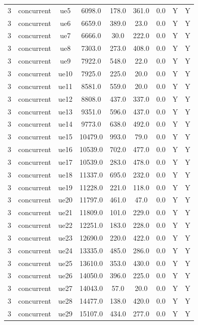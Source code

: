 \begin{table}[ht]
\begin{tabular}{|c|c|c|c|c|c|c|c|c|}
3 & concurrent & ue5 & 6098.0 & 178.0 & 361.0 & 0.0 & Y & Y \\
3 & concurrent & ue6 & 6659.0 & 389.0 & 23.0 & 0.0 & Y & Y \\
3 & concurrent & ue7 & 6666.0 & 30.0 & 222.0 & 0.0 & Y & Y \\
3 & concurrent & ue8 & 7303.0 & 273.0 & 408.0 & 0.0 & Y & Y \\
3 & concurrent & ue9 & 7922.0 & 548.0 & 22.0 & 0.0 & Y & Y \\
3 & concurrent & ue10 & 7925.0 & 225.0 & 20.0 & 0.0 & Y & Y \\
3 & concurrent & ue11 & 8581.0 & 559.0 & 20.0 & 0.0 & Y & Y \\
3 & concurrent & ue12 & 8808.0 & 437.0 & 337.0 & 0.0 & Y & Y \\
3 & concurrent & ue13 & 9351.0 & 596.0 & 437.0 & 0.0 & Y & Y \\
3 & concurrent & ue14 & 9773.0 & 638.0 & 492.0 & 0.0 & Y & Y \\
3 & concurrent & ue15 & 10479.0 & 993.0 & 79.0 & 0.0 & Y & Y \\
3 & concurrent & ue16 & 10539.0 & 702.0 & 477.0 & 0.0 & Y & Y \\
3 & concurrent & ue17 & 10539.0 & 283.0 & 478.0 & 0.0 & Y & Y \\
3 & concurrent & ue18 & 11337.0 & 695.0 & 232.0 & 0.0 & Y & Y \\
3 & concurrent & ue19 & 11228.0 & 221.0 & 118.0 & 0.0 & Y & Y \\
3 & concurrent & ue20 & 11797.0 & 461.0 & 47.0 & 0.0 & Y & Y \\
3 & concurrent & ue21 & 11809.0 & 101.0 & 229.0 & 0.0 & Y & Y \\
3 & concurrent & ue22 & 12251.0 & 183.0 & 228.0 & 0.0 & Y & Y \\
3 & concurrent & ue23 & 12690.0 & 220.0 & 422.0 & 0.0 & Y & Y \\
3 & concurrent & ue24 & 13335.0 & 485.0 & 286.0 & 0.0 & Y & Y \\
3 & concurrent & ue25 & 13610.0 & 353.0 & 430.0 & 0.0 & Y & Y \\
3 & concurrent & ue26 & 14050.0 & 396.0 & 225.0 & 0.0 & Y & Y \\
3 & concurrent & ue27 & 14043.0 & 57.0 & 20.0 & 0.0 & Y & Y \\
3 & concurrent & ue28 & 14477.0 & 138.0 & 420.0 & 0.0 & Y & Y \\
3 & concurrent & ue29 & 15107.0 & 434.0 & 277.0 & 0.0 & Y & Y \\

\end{tabular}
\end{table}
